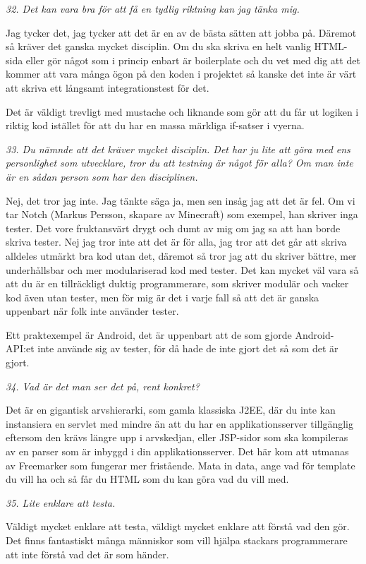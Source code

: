 \documentclass[11pt]{article}
\begin{document}
\emph{32. Det kan vara bra för att få en tydlig riktning kan jag tänka mig.}

Jag tycker det, jag tycker att det är en av de bästa sätten att jobba på. Däremot så kräver det ganska mycket disciplin. Om du ska skriva en helt vanlig HTML-sida eller gör något som i princip enbart är boilerplate och du vet med dig att det kommer att vara många ögon på den koden i projektet så kanske det inte är värt att skriva ett långsamt integrationstest för det.

Det är väldigt trevligt med mustache och liknande som gör att du får ut logiken i riktig kod istället för att du har en massa märkliga if-satser i vyerna.

\emph{33. Du nämnde att det kräver mycket disciplin. Det har ju lite att göra med ens personlighet som utvecklare, tror du att testning är något för alla? Om man inte är en sådan person som har den disciplinen.}

Nej, det tror jag inte. Jag tänkte säga ja, men sen insåg jag att det är fel. Om vi tar Notch (Markus Persson, skapare av Minecraft) som exempel, han skriver inga tester. Det vore fruktansvärt drygt och dumt av mig om jag sa att han borde skriva tester. Nej jag tror inte att det är för alla, jag tror att det går att skriva alldeles utmärkt bra kod utan det, däremot så tror jag att du skriver bättre, mer underhållsbar och mer modulariserad kod med tester. Det kan mycket väl vara så att du är en tillräckligt duktig programmerare, som skriver modulär och vacker kod även utan tester, men för mig är det i varje fall så att det är ganska uppenbart när folk inte använder tester.

Ett praktexempel är Android, det är uppenbart att de som gjorde Android-API:et inte använde sig av tester, för då hade de inte gjort det så som det är gjort.

\emph{34. Vad är det man ser det på, rent konkret?}

Det är en gigantisk arvshierarki, som gamla klassiska J2EE, där du inte kan instansiera en servlet med mindre än att du har en applikationsserver tillgänglig eftersom den krävs längre upp i arvskedjan, eller JSP-sidor som ska kompileras av en parser som är inbyggd i din applikationsserver. Det här kom att utmanas av Freemarker som fungerar mer fristående. Mata in data, ange vad för template du vill ha och så får du HTML som du kan göra vad du vill med.

\emph{35. Lite enklare att testa.}

Väldigt mycket enklare att testa, väldigt mycket enklare att förstå vad den gör. Det finns fantastiskt många människor som vill hjälpa stackars programmerare att inte förstå vad det är som händer.
\end{document}
